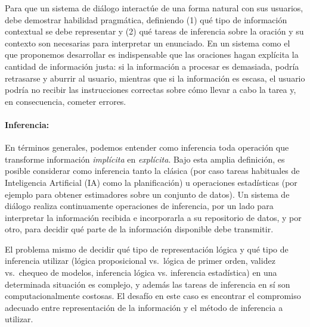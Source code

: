 Para que un sistema de di\'alogo interact\'ue de una forma natural con sus usuarios, debe
demostrar habilidad pragm\'atica, definiendo (1) qu\'e tipo de informaci\'on contextual se debe representar y (2) qu\'e tareas de inferencia sobre la oraci\'on y
su contexto son necesarias para interpretar un enunciado.
En un sistema como el que proponemos desarrollar
es indispensable que las oraciones hagan expl\'icita la cantidad de informaci\'on
justa: si la informaci\'on a procesar es demasiada, podr\'ia  retrasarse y aburrir al usuario, mientras que
si la informaci\'on es escasa, el usuario podr\'ia no recibir las instrucciones correctas sobre c\'omo llevar a cabo la
tarea y, en consecuencia, cometer errores.


%
%

  \paragraph{Inferencia:} En t\'erminos generales, podemos entender como
  inferencia toda operaci\'on que transforme informaci\'on \textit{impl\'icita} en
  \textit{expl\'icita}.  Bajo esta amplia definici\'on, es posible considerar como
  inferencia tanto la cl\'asica (por caso
  tareas habituales de Inteligencia Artificial (IA) como la planificaci\'on) u operaciones estad\'isticas (por ejemplo para obtener estimadores sobre un conjunto de datos).  Un sistema de di\'alogo realiza continuamente operaciones de inferencia, por un lado   para interpretar la informaci\'on recibida e incorporarla a su repositorio de datos, y por otro, para decidir qu\'e parte de la informaci\'on disponible debe transmitir.

  El problema mismo de decidir qu\'e tipo de representaci\'on l\'ogica y qu\'e tipo de inferencia utilizar (l\'ogica proposicional vs.\ l\'ogica de primer orden, validez vs.\ chequeo de modelos, inferencia l\'ogica vs. inferencia estad\'istica) en una determinada situaci\'on  es complejo, y adem\'as las tareas de inferencia en s\'i son computacionalmente costosas.  El desaf\'io en este caso es encontrar el compromiso adecuado entre representaci\'on de la informaci\'on y el m\'etodo de inferencia a utilizar.

